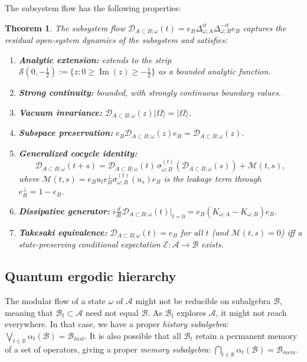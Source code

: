 \documentclass[a4paper,11pt]{article}
\newtheorem{theorem}{Theorem}
\theoremstyle{definition}
\theoremstyle{remark}
\newcommand{\mA}{\mathcal{A}}
\newcommand{\mB}{\mathcal{B}}
\begin{document}
The subsystem flow has the following properties:
\begin{theorem}\label{thm:subsystem-flow-properties}
The subsystem flow $\mathcal{D}_{A\subset B;\omega}(t) = e_B \Delta_{\omega;A}^{it}
\Delta_{\omega;B}^{-it} e_B$ captures the residual open-system dynamics of the
subsystem and satisfies:
\begin{enumerate}
    \item \textbf{Analytic extension:} extends to the strip
    $\mathcal{S}(0,-\tfrac{1}{2}) := \{z : 0 \ge \operatorname{Im}(z)
    \ge -\tfrac{1}{2}\}$ as a bounded analytic function.
    \item \textbf{Strong continuity:} bounded, with strongly continuous boundary values.
    \item \textbf{Vacuum invariance:} $\mathcal{D}_{A\subset B;\omega}(z)|\Omega\rangle
    = |\Omega\rangle$.
    \item \textbf{Subspace preservation:} $e_B \mathcal{D}_{A\subset B;\omega}(z)
    e_B = \mathcal{D}_{A\subset B;\omega}(z)$.
    \item \textbf{Generalized cocycle identity:}
    \begin{equation}
        \mathcal{D}_{A\subset B;\omega}(t+s)
        = \mathcal{D}_{A\subset B;\omega}(t)\,
          \sigma^{(t)}_{\omega;B}\!\left(\mathcal{D}_{A\subset B;\omega}(s)\right)
          + \mathcal{M}(t,s),
    \end{equation}
    where $\mathcal{M}(t,s)=e_B u_t e_B^\perp \sigma^{(t)}_{\omega;B}(u_s)e_B$ is the
    leakage term through $e_B^\perp=1-e_B$.
    \item \textbf{Dissipative generator:}
    $i \frac{d}{dt} \mathcal{D}_{A\subset B;\omega}(t)|_{t=0}
        = e_B (K_{\omega;A} - K_{\omega;B}) e_B$.
    \item \textbf{Takesaki equivalence:} $\mathcal{D}_{A\subset B;\omega}(t)=e_B$
    for all $t$ (and $\mathcal{M}(t,s)=0$) iff a state-preserving conditional
    expectation $\mathcal{E}: \mA \to \mB$ exists.
\end{enumerate}
\end{theorem}
 
\subsection{Quantum ergodic hierarchy}%
\label{subsec:qeh}
 
The modular flow of a state $\omega$ of $\mA$ might not be reducible on subalgebra
$\mB$, meaning that $\mB_t\subset \mA$ need not equal $\mB$.  As $\mB_t$ explores
$\mA$, it might not reach everywhere.  In that case, we have a proper \emph{history
subalgebra}:
$\bigvee_{t\in\mathbb{R}}\alpha_t(\mB)=\mB_{hist}$.
It is also possible that all $\mB_t$ retain a permanent memory of a set of operators,
giving a proper \emph{memory subalgebra}:
$\bigcap_{t\in\mathbb{R}}\alpha_t(\mB)=\mB_{mem}$.
 
\end{document}
